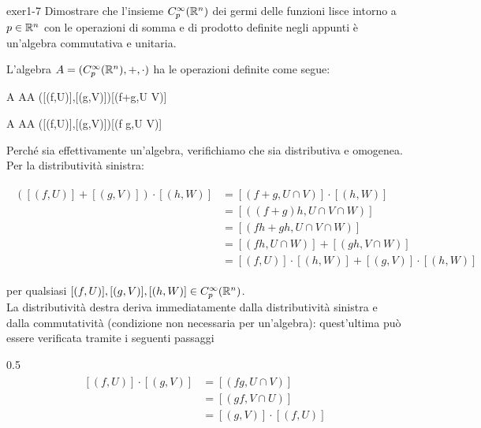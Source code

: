 {exer1-7}
{
Dimostrare che l'insieme $ C_{p}^{\infty}(\mathbb{R}^{n}) $ dei germi delle funzioni lisce intorno a $ p \in \mathbb{R}^{n} $ con le operazioni di somma e di prodotto definite negli appunti è un'algebra commutativa e unitaria.
}
{
L'algebra $ A = (C_{p}^{\infty}(\mathbb{R}^{n}),+,\cdot) $ ha le operazioni definite come segue:

\map{+}
	{A \times A}{A}
	{([(f,U)],[(g,V)])}{[(f+g,U \cap V)]}

\map{\cdot}
	{A \times A}{A}
	{([(f,U)],[(g,V)])}{[(f g,U \cap V)]}

Perché sia effettivamente un'algebra, verifichiamo che sia distributiva e omogenea. \\
Per la distributività sinistra:

\begin{align}
	\begin{split}
		([(f,U)] + [(g,V)]) \cdot [(h,W)] &= [(f+g,U \cap V)] \cdot [(h,W)] \\
		&= [((f+g) h,U \cap V \cap W)] \\
		&= [(fh + gh,U \cap V \cap W)] \\
		&= [(fh,U \cap W)] + [(gh,V \cap W)] \\
		&= [(f,U)] \cdot [(h,W)] + [(g,V)] \cdot [(h,W)]
	\end{split}
\end{align}

per qualsiasi $ [(f,U)], [(g,V)], [(h,W)] \in C_{p}^{\infty}(\mathbb{R}^{n}) $. \\
La distributività destra deriva immediatamente dalla distributività sinistra e dalla commutatività (condizione non necessaria per un'algebra): quest'ultima può essere verificata tramite i seguenti passaggi

	{0.5}{%
			\begin{align}
				\begin{split}
					[(f,U)] \cdot [(g,V)] &= [(fg,U \cap V)] \\
					&= [(gf,V \cap U)] \\
					&= [(g,V)] \cdot [(f,U)]
				\end{split}
			\end{align}
			}

}
